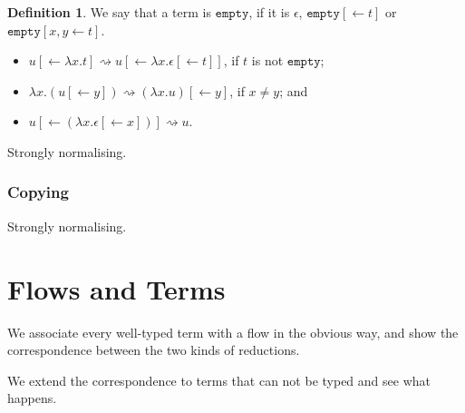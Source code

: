 \documentclass[11pt,a4paper]{article}
\theoremstyle{definition}
\newtheorem{definition}{Definition}
\theoremstyle{plain}
\theoremstyle{remark}
\begin{document}
\newcommand{\tempty}{{\mathtt{empty}}}

\begin{definition}
We say that a term is $\tempty$, if it is $\epsilon$, $\tempty[\leftarrow t]$ or $\tempty[x,y\leftarrow t]$.
\end{definition}

\begin{itemize}
\item $u[\leftarrow\lambda x.t]\rightsquigarrow u[\leftarrow\lambda x.\epsilon[\leftarrow t]]$, if $t$ is not $\tempty$;
\item $\lambda x.(u[\leftarrow y])\rightsquigarrow (\lambda x.u)[\leftarrow y]$, if $x\neq y$; and
\item $u[\leftarrow(\lambda x.\epsilon[\leftarrow x])]\rightsquigarrow u$.
\end{itemize}

Strongly normalising.

\subsubsection{Copying}

Strongly normalising.

\section{Flows and Terms}

We associate every well-typed term with a flow in the obvious way, and show the correspondence between the two kinds of reductions.

We extend the correspondence to terms that can not be typed and see what happens.
\end{document}
